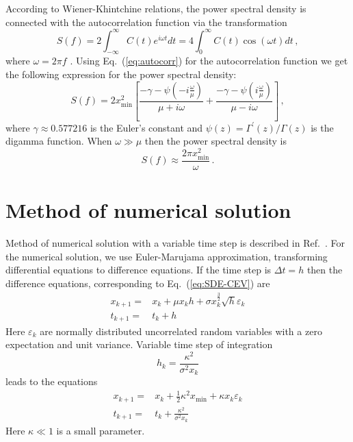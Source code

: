 \documentclass{article}
\begin{document}
According to Wiener-Khintchine relations, the power spectral density
is connected with the autocorrelation function via the transformation
\begin{equation}
S(f)=2\int_{-\infty}^{\infty}C(t)e^{i\omega t}dt=4\int_{0}^{\infty}C(t)
\cos(\omega t)dt\,,
\label{eq:wk}
\end{equation}
where $\omega=2\pi f$ . Using Eq.~(\ref{eq:autocorr}) for the autocorrelation
function we get the following expression for the power spectral density:
\begin{equation}
S(f)=2x_{\mathrm{min}}^{2}\left[\frac{-\gamma
-\psi\left(-i\frac{\omega}{\mu}\right)}{\mu+i\omega}
+\frac{-\gamma-\psi\left(i\frac{\omega}{\mu}\right)}{\mu-i\omega}\right]\,,
\end{equation}
where $\gamma\approx0.577216$ is the Euler's constant and
$\psi(z)=\Gamma^{\prime}(z)/\Gamma(z)$ is the digamma function. When
$\omega\gg\mu$ then the power spectral density is
\begin{equation}
S(f)\approx\frac{2\pi x_{\mathrm{min}}^{2}}{\omega}\,.
\end{equation}


\section{Method of numerical solution}

Method of numerical solution with a variable time step is described
in Ref.~\cite{ruseckas2016}. For the numerical solution, we use
Euler-Marujama approximation, transforming differential equations
to difference equations. If the time step is $\Delta t=h$ then the
difference equations, corresponding to Eq.~(\ref{eq:SDE-CEV}) are
\begin{align}
x_{k+1} = & x_{k}+\mu x_{k}h+\sigma x_{k}^{\frac{3}{2}}\sqrt{h}\varepsilon_{k}\\
t_{k+1} = & t_{k}+h
\end{align}
Here $\varepsilon_{k}$ are normally distributed uncorrelated random
variables with a zero expectation and unit variance. Variable time
step of integration 
\[
h_{k}=\frac{\kappa^{2}}{\sigma^{2}x_{k}}
\]
leads to the equations
\begin{align}
x_{k+1} = & x_{k}+\frac{1}{2}\kappa^{2}x_{\mathrm{min}}+\kappa x_{k}\varepsilon_{k}\\
t_{k+1} = & t_{k}+\frac{\kappa^{2}}{\sigma^{2}x_{k}}
\end{align}
Here $\kappa\ll1$ is a small parameter.
\end{document}
